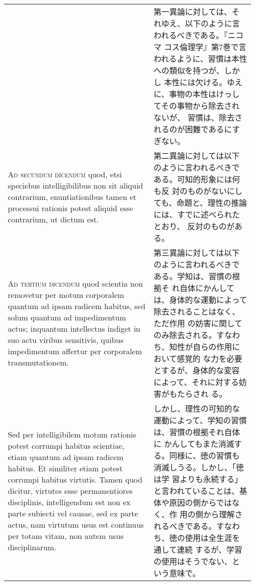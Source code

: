\documentclass[10pt]{jsarticle} %
\begin{document}
\begin{longtable}{p{21em}p{21em}}
&

第一異論に対しては、それゆえ、以下のように言われるべきである。『ニコマ
コス倫理学』第7巻で言われるように、習慣は本性への類似を持つが、しかし
本性には欠ける。ゆえに、事物の本性はけっしてその事物から除去されないが、
習慣は、除去されるのが困難であるにすぎない。

\\



{\scshape Ad secundum dicendum} quod, etsi speciebus intelligibilibus
non sit aliquid contrarium, enuntiationibus tamen et processui
rationis potest aliquid esse contrarium, ut dictum est.


&

第二異論に対しては以下のように言われるべきである。可知的形象には何も反
対のものがないにしても、命題と、理性の推論には、すでに述べられたとおり、
反対のものがある。

\\



{\scshape Ad tertium dicendum} quod scientia non removetur per motum
corporalem quantum ad ipsam radicem habitus, sed solum quantum ad
impedimentum actus; inquantum intellectus indiget in suo actu viribus
sensitivis, quibus impedimentum affertur per corporalem
transmutationem.


&

第三異論に対しては以下のように言われるべきである。学知は、習慣の根拠そ
れ自体にかんしては、身体的な運動によって除去されることはなく、ただ作用
の妨害に関してのみ除去される。すなわち、知性が自らの作用において感覚的
な力を必要とするが、身体的な変容によって、それに対する妨害がもたらされ
る。

\\


Sed per intelligibilem motum rationis potest corrumpi habitus
scientiae, etiam quantum ad ipsam radicem habitus. Et similiter etiam
potest corrumpi habitus virtutis. Tamen quod dicitur, virtutes esse
permanentiores disciplinis, intelligendum est non ex parte subiecti
vel causae, sed ex parte actus, nam virtutum usus est continuus per
totam vitam, non autem usus disciplinarum.


&

しかし、理性の可知的な運動によって、学知の習慣は、習慣の根拠それ自体に
かんしてもまた消滅する。同様に、徳の習慣も消滅しうる。しかし、「徳は学
習よりも永続する」と言われていることは、基体や原因の側からではなく、作
用の側から理解されるべきである。すなわち、徳の使用は全生涯を通して連続
するが、学習の使用はそうでない、という意味で。

\end{longtable}
\end{document}
